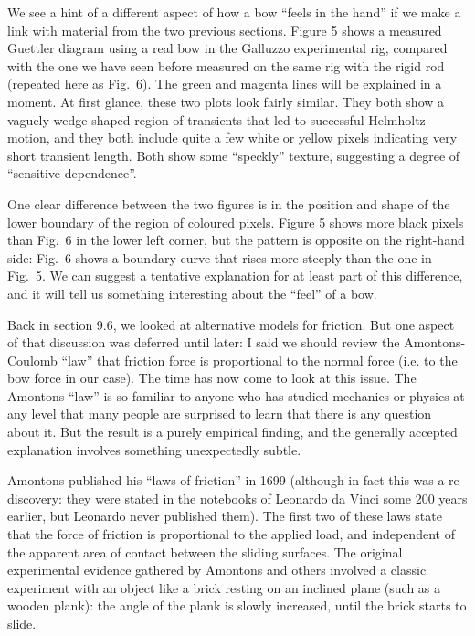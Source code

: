 
  We see a hint of a different aspect of how a bow “feels in the hand” if we 
  make a link with material from the two previous sections. Figure 5 shows a 
  measured Guettler diagram using a real bow in the Galluzzo experimental rig, 
  compared with the one we have seen before measured on the same rig with the 
  rigid rod (repeated here as Fig.\ 6). The green and magenta lines will be 
  explained in a moment. At first glance, these two plots look fairly similar. 
  They both show a vaguely wedge-shaped region of transients that led to 
  successful Helmholtz motion, and they both include quite a few white or 
  yellow pixels indicating very short transient length. Both show some 
  “speckly” texture, suggesting a degree of “sensitive dependence”. 



  One clear difference between the two figures is in the position and shape of 
  the lower boundary of the region of coloured pixels. Figure 5 shows more 
  black pixels than Fig.\ 6 in the lower left corner, but the pattern is 
  opposite on the right-hand side: Fig.\ 6 shows a boundary curve that rises 
  more steeply than the one in Fig.\ 5. We can suggest a tentative explanation 
  for at least part of this difference, and it will tell us something 
  interesting about the “feel” of a bow. 

  Back in section 9.6, we looked at alternative models for friction. But one 
  aspect of that discussion was deferred until later: I said we should review 
  the Amontons-Coulomb “law” that friction force is proportional to the normal 
  force (i.e. to the bow force in our case). The time has now come to look at 
  this issue. The Amontons “law” is so familiar to anyone who has studied 
  mechanics or physics at any level that many people are surprised to learn 
  that there is any question about it. But the result is a purely empirical 
  finding, and the generally accepted explanation involves something 
  unexpectedly subtle. 

  Amontons published his “laws of friction” in 1699 (although in fact this was 
  a re-discovery: they were stated in the notebooks of Leonardo da Vinci some 
  200 years earlier, but Leonardo never published them). The first two of these 
  laws state that the force of friction is proportional to the applied load, 
  and independent of the apparent area of contact between the sliding surfaces. 
  The original experimental evidence gathered by Amontons and others involved a 
  classic experiment with an object like a brick resting on an inclined plane 
  (such as a wooden plank): the angle of the plank is slowly increased, until 
  the brick starts to slide. 

